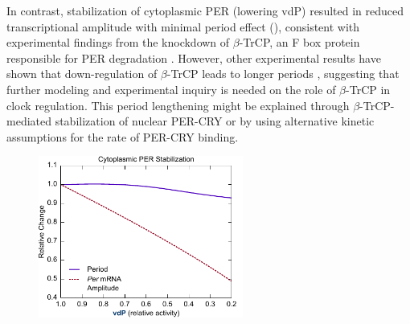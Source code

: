 In contrast, stabilization of cytoplasmic PER (lowering vdP) resulted in reduced transcriptional amplitude with minimal period effect (), consistent with experimental findings from the knockdown of $\beta$-TrCP, an F box protein responsible for PER degradation \cite{Ohsaki2008}. 
However, other experimental results have shown that down-regulation of $\beta$-TrCP leads to longer periods \cite{Reischl2007}, suggesting that further modeling and experimental inquiry is needed on the role of $\beta$-TrCP in clock regulation. 
This period lengthening might be explained through $\beta$-TrCP-mediated stabilization of nuclear PER-CRY or by using alternative kinetic assumptions for the rate of PER-CRY binding. 

\begin{figure}[h]
  \centering
  \includegraphics[width=0.6\textwidth]{chap4/figures/figS4.pdf}
  \label{fig:4S3}
\end{figure}


